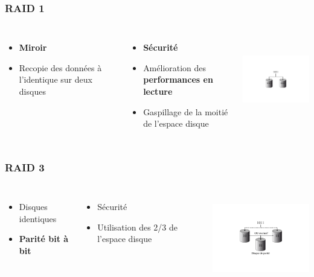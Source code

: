 \begin{frame}
\frametitle{RAID 1}
\begin{columns}
\begin{itemize}
\item \textbf{Miroir}
\item Recopie des données à l'identique sur deux disques
\end{itemize}
\begin{itemize}
\item \textbf{Sécurité}
\item Amélioration des \textbf{performances en lecture}
\item Gaspillage de la moitié de l’espace disque
\end{itemize}
\includegraphics[height=4cm]{../illustration/RAID1.pdf}
\end{columns}
\end{frame}


\begin{frame}
\frametitle{RAID 3}
\begin{columns}
\begin{itemize}
\item Disques identiques
\item \textbf{Parité bit à bit}
\end{itemize}
\begin{itemize}
\item Sécurité
\item Utilisation des 2/3 de l’espace disque
\end{itemize}
\includegraphics[height=4cm]{../illustration/RAID3.pdf}
\end{columns}
\end{frame}


